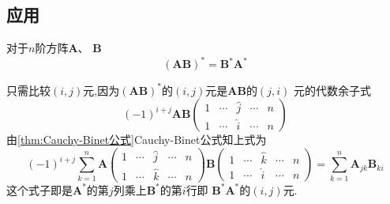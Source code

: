 \subsection{应用}
\begin{green}
\begin{corollary}[方阵的积的伴随阵]
对于$n$阶方阵$\bm{A}$、
$\bm{B}$
\[
\left(\bm{AB}\right)^* = \bm{B}^*\bm{A}^*
\]
\end{corollary}
\begin{Proof}
只需比较$\left(i,j\right)$元,因为$\left(\bm{AB}\right)^*$的$
\left(i,j\right)$元是$\bm{AB}$的$\left(j,i\right)$
元的代数余子式
\[
\left(-1\right)^{i+j}\bm{AB}\begin{pmatrix}
    1&\cdots&\hat{j}&\cdots&n\\
    1&\cdots&\hat{i}&\cdots&n
\end{pmatrix}
\]
由\cref{thm:Cauchy-Binet公式}Cauchy-Binet公式知上式为
\[
\left(-1\right)^{i+j}\sum_{k=1}^{n}
\bm{A}\begin{pmatrix}
    1&\cdots&\hat{j}&\cdots&n\\
    1&\cdots&\hat{k}&\cdots&n
\end{pmatrix}\bm{B}\begin{pmatrix}
    1&\cdots&\hat{k}&\cdots&n\\
    1&\cdots&\hat{i}&\cdots&n
\end{pmatrix}=\sum_{k=1}^{n}\bm{A}_{jk}\bm{B}_{ki}
\]
这个式子即是$\bm{A}^*$的第$j$列乘上$\bm{B}^*$的第$i$行即
$\bm{B}^*\bm{A}^*$的$\left(i,j\right)$元.
\end{Proof}
\end{green}

